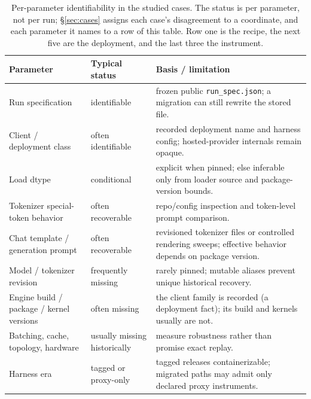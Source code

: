 \begin{table}[t]
\caption{Per-parameter identifiability in the studied cases. The status is per
parameter, not per run; \S\ref{sec:cases} assigns each case's disagreement to a
coordinate, and each parameter it names to a row of this table. Row one is the
recipe, the next five are the deployment, and the last three the instrument.}
\label{tab:identifiability}
\begin{center}
\small
\begin{tabularx}{\linewidth}{@{}%
  >{\raggedright\arraybackslash\hsize=0.80\hsize}X
  >{\raggedright\arraybackslash\hsize=0.55\hsize}X
  >{\raggedright\arraybackslash\hsize=1.65\hsize}X@{}}
\toprule
\textbf{Parameter} & \textbf{Typical status} & \textbf{Basis / limitation} \\
\midrule
Run specification & identifiable & frozen public \texttt{run\_spec.json};
a migration can still rewrite the stored file. \\
Client / deployment class & often identifiable & recorded deployment name and
harness config; hosted-provider internals remain opaque. \\
Load dtype & conditional & explicit when pinned; else inferable only from loader
source and package-version bounds. \\
Tokenizer special-token behavior & often recoverable & repo/config inspection and
token-level prompt comparison. \\
Chat template / generation prompt & often recoverable & revisioned tokenizer files
or controlled rendering sweeps; effective behavior depends on package version. \\
Model / tokenizer revision & frequently missing & rarely pinned; mutable aliases
prevent unique historical recovery. \\
Engine build / package / kernel versions & often missing & the client family is
recorded (a deployment fact); its build and kernels usually are not. \\
Batching, cache, topology, hardware & usually missing historically & measure
robustness rather than promise exact replay. \\
Harness era & tagged or proxy-only & tagged releases containerizable; migrated
paths may admit only declared proxy instruments. \\
\bottomrule
\end{tabularx}
\end{center}
\end{table}
